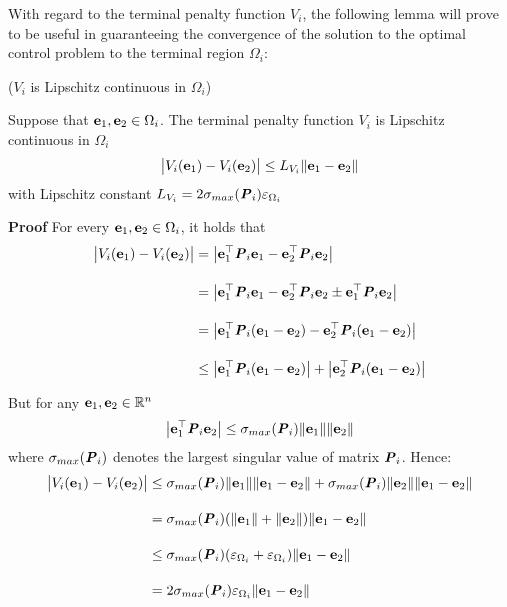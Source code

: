 With regard to the terminal penalty function $V_i$, the following lemma will
prove to be useful in guaranteeing the convergence of the solution to the
optimal control problem to the terminal region $\Omega_i$:

\begin{bw_box}
\begin{lemma} ($V_i$ is Lipschitz continuous in $\Omega_i$)
\label{lemma:V_Lipschitz_e_0}

  Suppose that $\bm{\mathbf{e}}_1, \bm{\mathbf{e}}_2 \in \Omega_i$.
  The terminal penalty function $V_i$ is Lipschitz continuous in
  $\Omega_i$
  $$\big|V_i(\bm{\mathbf{e}}_1) - V_i(\bm{\mathbf{e}}_2)\big| \leq L_{V_i} \|\bm{\mathbf{e}}_1 - \bm{\mathbf{e}}_2\|$$
  with Lipschitz constant $L_{V_i} = 2 \sigma_{max}(\bm{\mathit{P}}_i) \varepsilon_{\Omega_i} $\\

\end{lemma}
\end{bw_box}


\begin{gg_box}
\textbf{Proof} For every $\bm{\mathbf{e}}_1, \bm{\mathbf{e}}_2 \in \Omega_i$, it holds that
\begin{align}
  \big|V_i(\bm{\mathbf{e}}_1) - V_i(\bm{\mathbf{e}}_2)\big| &= \big|\bm{\mathbf{e}}_1^{\top} \bm{\mathit{P}}_i \bm{\mathbf{e}}_1 - \bm{\mathbf{e}}_2^{\top} \bm{\mathit{P}}_i \bm{\mathbf{e}}_2\big| \\[2.5ex]
    &= \big|\bm{\mathbf{e}}_1^{\top} \bm{\mathit{P}}_i \bm{\mathbf{e}}_1 - \bm{\mathbf{e}}_2^{\top} \bm{\mathit{P}}_i \bm{\mathbf{e}}_2 \pm \bm{\mathbf{e}}_1^{\top} \bm{\mathit{P}}_i \bm{\mathbf{e}}_2\big| \\[2.5ex]
    &= \big|\bm{\mathbf{e}}_1^{\top} \bm{\mathit{P}}_i (\bm{\mathbf{e}}_1 -\bm{\mathbf{e}}_2) - \bm{\mathbf{e}}_2^{\top} \bm{\mathit{P}}_i (\bm{\mathbf{e}}_1-\bm{\mathbf{e}}_2)\big| \\[2.5ex]
    &\leq \big|\bm{\mathbf{e}}_1^{\top} \bm{\mathit{P}}_i (\bm{\mathbf{e}}_1 -\bm{\mathbf{e}}_2)\big| + \big|\bm{\mathbf{e}}_2^{\top} \bm{\mathit{P}}_i (\bm{\mathbf{e}}_1-\bm{\mathbf{e}}_2)\big|
\end{align}

But for any $\bm{\mathbf{e}}_1, \bm{\mathbf{e}}_2 \in \mathbb{R}^n$
$$\big|\bm{\mathbf{e}}_1^{\top} \bm{\mathit{P}}_i \bm{\mathbf{e}}_2\big| \leq \sigma_{max}(\bm{\mathit{P}}_i) \|\bm{\mathbf{e}}_1\| \|\bm{\mathbf{e}}_2\|$$
where $\sigma_{max}(\bm{\mathit{P}}_i)$ denotes the largest singular value of matrix
$\bm{\mathit{P}}_i$. Hence:
\begin{align}
\big|V_i(\bm{\mathbf{e}}_1) - V_i(\bm{\mathbf{e}}_2)\big| &\leq
  \sigma_{max}(\bm{\mathit{P}}_i) \|\bm{\mathbf{e}}_1\| \|\bm{\mathbf{e}}_1 - \bm{\mathbf{e}}_2\| +
  \sigma_{max}(\bm{\mathit{P}}_i) \|\bm{\mathbf{e}}_2\| \|\bm{\mathbf{e}}_1 - \bm{\mathbf{e}}_2\| \\[2.5ex]
  &= \sigma_{max}(\bm{\mathit{P}}_i) (\|\bm{\mathbf{e}}_1\| + \|\bm{\mathbf{e}}_2\|)\|\bm{\mathbf{e}}_1 - \bm{\mathbf{e}}_2\| \\[2.5ex]
  & \leq \sigma_{max}(\bm{\mathit{P}}_i) (\varepsilon_{\Omega_i} + \varepsilon_{\Omega_i})\|\bm{\mathbf{e}}_1 - \bm{\mathbf{e}}_2\| \\[2.5ex]
  &= 2 \sigma_{max}(\bm{\mathit{P}}_i) \varepsilon_{\Omega_i} \|\bm{\mathbf{e}}_1 - \bm{\mathbf{e}}_2\|
\end{align}
\qedsymbol
\end{gg_box}

